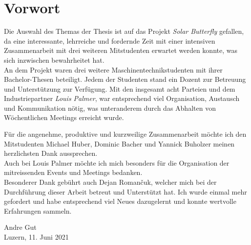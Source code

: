 \section*{Vorwort}
Die Auswahl des Themas der Thesis ist auf das Projekt \emph{Solar Butterfly} gefallen, da eine interessante, lehrreiche und fordernde Zeit mit einer intensiven Zusammenarbeit mit drei weiteren Mitstudenten erwartet werden konnte, was sich inzwischen bewahrheitet hat.\\
An dem Projekt waren drei weitere Maschinentechnikstudenten mit ihrer Bachelor-Thesen beteiligt. Jedem der Studenten stand ein Dozent zur Betreuung und Unterstützung zur Verfügung. Mit den insgesamt acht Parteien und dem Industriepartner \emph{Louis Palmer}, war entsprechend viel Organisation, Austausch und Kommunikation nötig, was unteranderem durch das Abhalten von Wöchentlichen Meetings erreicht wurde.

Für die angenehme, produktive und kurzweilige Zusammenarbeit möchte ich den Mitstudenten Michael Huber, Dominic Bacher und Yannick Buholzer meinen herzlichsten Dank aussprechen.\\
Auch bei Louis Palmer möchte ich mich besonders für die Organisation der mitreissenden Events und Meetings bedanken.\\
Besonderer Dank gebührt auch Dejan Roman\v{c}uk, welcher mich bei der Durchführung dieser Arbeit betreut und Unterstützt hat. Ich wurde einmal mehr gefordert und habe entsprechend viel Neues dazugelernt und konnte wertvolle Erfahrungen sammeln.

\vspace{2cm}

\begin{flushright}
  Andre Gut\\
  Luzern, 11. Juni 2021
\end{flushright}


%
%
%
\newpage
